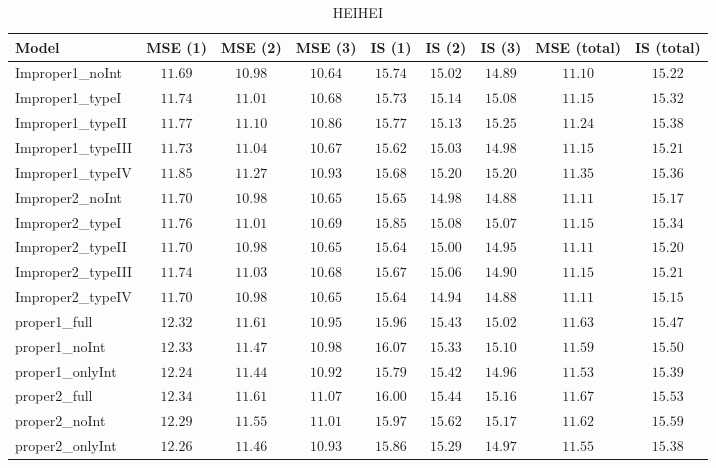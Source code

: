 \begin{table}

\caption{\label{tab:model-choice-sc7}HEIHEI}
\centering
\begin{tabular}{lcccccccc}
\hline
Model  & MSE (1) & MSE (2) & MSE (3) & IS (1) & IS (2) & IS (3) & MSE (total) & \multicolumn{1}{c}{IS (total)} \\ 
\hline
Improper1_noInt  & $11.69$ & $10.98$ & $10.64$ & $15.74$ & $15.02$ & $14.89$ & $11.10$ & $15.22$ \\
Improper1_typeI  & $11.74$ & $11.01$ & $10.68$ & $15.73$ & $15.14$ & $15.08$ & $11.15$ & $15.32$ \\
Improper1_typeII  & $11.77$ & $11.10$ & $10.86$ & $15.77$ & $15.13$ & $15.25$ & $11.24$ & $15.38$ \\
Improper1_typeIII  & $11.73$ & $11.04$ & $10.67$ & $15.62$ & $15.03$ & $14.98$ & $11.15$ & $15.21$ \\
Improper1_typeIV  & $11.85$ & $11.27$ & $10.93$ & $15.68$ & $15.20$ & $15.20$ & $11.35$ & $15.36$ \\
Improper2_noInt  & $11.70$ & $10.98$ & $10.65$ & $15.65$ & $14.98$ & $14.88$ & $11.11$ & $15.17$ \\
Improper2_typeI  & $11.76$ & $11.01$ & $10.69$ & $15.85$ & $15.08$ & $15.07$ & $11.15$ & $15.34$ \\
Improper2_typeII  & $11.70$ & $10.98$ & $10.65$ & $15.64$ & $15.00$ & $14.95$ & $11.11$ & $15.20$ \\
Improper2_typeIII  & $11.74$ & $11.03$ & $10.68$ & $15.67$ & $15.06$ & $14.90$ & $11.15$ & $15.21$ \\
Improper2_typeIV  & $11.70$ & $10.98$ & $10.65$ & $15.64$ & $14.94$ & $14.88$ & $11.11$ & $15.15$ \\
proper1_full  & $12.32$ & $11.61$ & $10.95$ & $15.96$ & $15.43$ & $15.02$ & $11.63$ & $15.47$ \\
proper1_noInt  & $12.33$ & $11.47$ & $10.98$ & $16.07$ & $15.33$ & $15.10$ & $11.59$ & $15.50$ \\
proper1_onlyInt  & $12.24$ & $11.44$ & $10.92$ & $15.79$ & $15.42$ & $14.96$ & $11.53$ & $15.39$ \\
proper2_full  & $12.34$ & $11.61$ & $11.07$ & $16.00$ & $15.44$ & $15.16$ & $11.67$ & $15.53$ \\
proper2_noInt  & $12.29$ & $11.55$ & $11.01$ & $15.97$ & $15.62$ & $15.17$ & $11.62$ & $15.59$ \\
proper2_onlyInt  & $12.26$ & $11.46$ & $10.93$ & $15.86$ & $15.29$ & $14.97$ & $11.55$ & $15.38$ \\
\hline 
\end{tabular}


\end{table}
